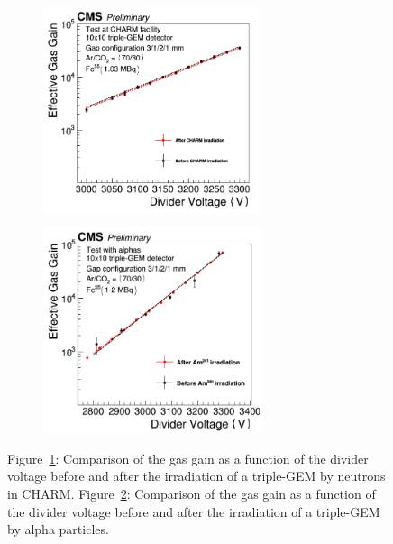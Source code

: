 	\begin{figure}[H]
		\begin{subfigure}{0.5\linewidth}
			\centering
			\includegraphics[height=6cm]{fig/chapt3/GEM-CHARM.png}
			\caption{\label{fig:GEM-discharges:A}}
		\end{subfigure}
		\begin{subfigure}{0.5\linewidth}
			\centering
			\includegraphics[height=6cm]{fig/chapt3/GEM-alpha.png}
			\caption{\label{fig:GEM-discharges:B}}
		\end{subfigure}
		\caption{\label{fig:GEM-discharges} Figure~\ref{fig:GEM-discharges:A}: Comparison of the gas gain as a function of the divider voltage before and after the irradiation of a triple-GEM by neutrons in CHARM. Figure~\ref{fig:GEM-discharges:B}: Comparison of the gas gain as a function of the divider voltage before and after the irradiation of a triple-GEM by alpha particles.}
	\end{figure}
	
